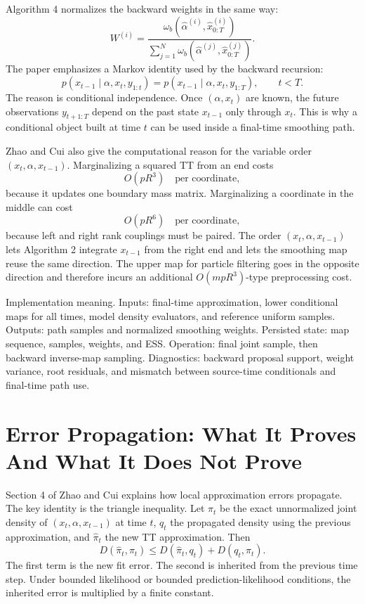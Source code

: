 \documentclass[11pt]{article}
\begin{document}
Algorithm 4 normalizes the backward weights in the same way:
\[
    W^{(i)}
    =
    \frac{\omega_b(\widehat\alpha^{(i)},\widehat x_{0:T}^{(i)})}
    {\sum_{j=1}^{N}\omega_b(\widehat\alpha^{(j)},\widehat x_{0:T}^{(j)})}.
    \label{eq:p24-b6}
\]
The paper emphasizes a Markov identity used by the backward recursion:
\[
    p(x_{t-1}\mid \alpha,x_t,y_{1:t})
    =
    p(x_{t-1}\mid \alpha,x_t,y_{1:T}),
    \qquad t<T.
    \label{eq:p24-b7}
\]
The reason is conditional independence.  Once \((\alpha,x_t)\) are known, the
future observations \(y_{t+1:T}\) depend on the past state \(x_{t-1}\) only
through \(x_t\).  This is why a conditional object built at time \(t\) can be
used inside a final-time smoothing path.

Zhao and Cui \cite{zhao2024ttsequential} also give the computational reason for the variable order
\((x_t,\alpha,x_{t-1})\).  Marginalizing a squared TT from an end costs
\[
    O(pR^3)\quad\text{per coordinate},
    \label{eq:p24-b8}
\]
because it updates one boundary mass matrix.  Marginalizing a coordinate in the
middle can cost
\[
    O(pR^6)\quad\text{per coordinate},
    \label{eq:p24-b9}
\]
because left and right rank couplings must be paired.  The order
\((x_t,\alpha,x_{t-1})\) lets Algorithm 2 integrate \(x_{t-1}\) from the right
end and lets the smoothing map reuse the same direction.  The upper map for
particle filtering goes in the opposite direction and therefore incurs an
additional \(O(mpR^3)\)-type preprocessing cost.

Implementation meaning. Inputs: final-time approximation, lower
conditional maps for all times, model density evaluators, and reference uniform
samples.  Outputs: path samples and normalized smoothing weights.  Persisted
state: map sequence, samples, weights, and ESS.  Operation: final joint sample,
then backward inverse-map sampling.  Diagnostics: backward proposal support,
weight variance, root residuals, and mismatch between source-time conditionals
and final-time path use.

\section{Error Propagation: What It Proves And What It Does Not Prove}

Section 4 of Zhao and Cui \cite{zhao2024ttsequential} explains how local approximation errors propagate.  The
key identity is the triangle inequality.  Let \(\pi_t\) be the exact
unnormalized joint density of \((x_t,\alpha,x_{t-1})\) at time \(t\), \(q_t\)
the propagated density using the previous approximation, and
\(\widehat\pi_t\) the new TT approximation.  Then
\[
    D(\widehat\pi_t,\pi_t)
    \le
    D(\widehat\pi_t,q_t)+D(q_t,\pi_t).
    \label{eq:p24-e1}
\]
The first term is the new fit error.  The second is inherited from the previous
time step.  Under bounded likelihood or bounded prediction-likelihood
conditions, the inherited error is multiplied by a finite constant.
\end{document}
